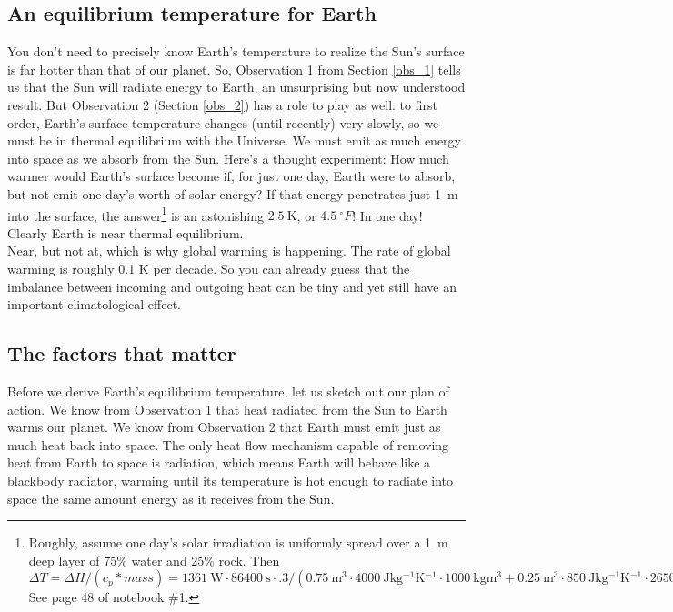 \subsection{An equilibrium temperature for Earth}
You don't need to precisely know Earth's temperature to realize the Sun's surface is far hotter than that of our planet. So, Observation 1 from Section \ref{obs_1} tells us that the Sun will radiate energy to Earth, an unsurprising but now understood result. But Observation 2 (Section \ref{obs_2}) has a role to play as well: to first order, Earth's surface temperature changes (until recently) very slowly, so we must be in thermal equilibrium with the Universe. We must emit as much energy into space as we absorb from the Sun. Here's a thought experiment: How much warmer would Earth's surface become if, for just one day, Earth were to absorb, but not emit one day's worth of solar energy? If that energy penetrates just \SI{1}{\metre} into the surface, the answer\footnote{Roughly, assume one day's solar irradiation is uniformly spread over a \SI{1}{\metre} deep layer of 75\% water and 25\% rock. Then  
	$\Delta T=\Delta H/(c_p*mass)=\SI{1361}{\watt}\cdot \SI{86400}{\second}\cdot .3/(\SI{0.75}{\metre^3}\cdot\SI{4000}{\joule\kilo\gram^{-1}\kelvin^{-1}}\cdot \SI{1000}{\kilo\gram\metre^3} + \SI{0.25}{\metre^3}\cdot\SI{850}{\joule\kilo\gram^{-1}\kelvin^{-1}}\cdot \SI{2650}{\kilo\gram\metre^3})=2.5 K$
See page 48 of notebook \#1.} is an astonishing $\SI{2.5}{\kelvin}$, or $4.5\ ^{\circ}F$! In one day! Clearly Earth is near thermal equilibrium.\\

Near, but not at, which is why global warming is happening. The rate of global warming is roughly 0.1 K per decade. So you can already guess that the imbalance between incoming and outgoing heat can be tiny and yet still have an important climatological effect.

\subsection{The factors that matter}
Before we derive Earth's equilibrium temperature, let us sketch out our plan of action. We know from Observation 1 that heat radiated from the Sun to Earth warms our planet. We know from Observation 2 that Earth must emit just as much heat back into space. The only heat flow mechanism capable of removing heat from Earth to space is radiation, which means Earth will behave like a blackbody radiator, warming until its temperature is hot enough to radiate into space the same amount energy as it receives from the Sun. 
